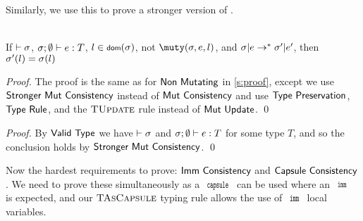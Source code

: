 Similarly, we use this  to prove a stronger version of .

\SS\begin{Corollary}\ \\
	\indent If $\vdash\sigma$, $\tyr eT$, $l\in\dom(\s)$, not $\muty(\s,e,l)$,
	and $\sigma|e\rightarrow^*\sigma'|e'$, then $\sigma'(l) = \sigma(l)$
\end{Corollary}
\SS\begin{proof}
	The proof is the same as for $\textsf{Non Mutating}$ in \autoref{s:proof},
	except we use $\textsf{Stronger Mut Consistency}$ instead of $\textsf{Mut Consistency}$
	and use $\textsf{Type Preservation}$, $\textsf{Type Rule}$, and the
	$\textsc{TUpdate}$ rule instead of $\textsf{Mut Update}$.
\qed\end{proof}

\setcounter{requirement}{2}
\SS\REQMutCons
\SS\begin{proof}
	By $\textsf{Valid Type}$ we have $\vdash\sigma$ and $\tyr eT$ for some
	type $T$, and so the conclusion holds by $\textsf{Stronger Mut Consistency}$.
\qed\end{proof}

\LS

Now the hardest requirements to prove: $\textsf{Imm Consistency}$ and $\textsf{Capsule Consistency}$.
We need to prove these simultaneously as a $\Kw{capsule}$ can be used where an $\Kw{imm}$ is expected, and our $\textsc{TAsCapsule}$ typing rule allows the use of $\Kw{imm}$ local variables.

